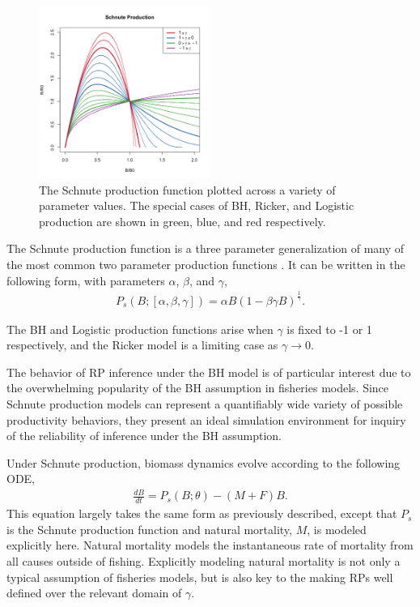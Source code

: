 \documentclass[12pt]{article}
\begin{document}
%
\begin{figure}
\vspace{-2cm}
\includegraphics[width=0.5\textwidth]{../gpBias/g3.png}
\vspace{-1cm}
\caption{
The Schnute production function plotted across a variety of parameter
values. The special cases of BH, Ricker, and Logistic production are shown in
green, blue, and red respectively.
}
\label{sRegimes}
\end{figure}
The Schnute production function is a three parameter generalization of many of 
the most common two parameter production functions . %
It can be written in the following form, with parameters $\alpha$, $\beta$, and $\gamma$,
%
\begin{align}
P_s(B; [\alpha, \beta, \gamma]) = \alpha B (1-\beta\gamma B)^{\frac{1}{\gamma}}.
\end{align}

%
The BH and Logistic production functions arise when $\gamma$ is fixed to -1 or 
1 respectively, and the Ricker model is a limiting case as $\gamma\rightarrow0$. %

%
The behavior of RP inference under the BH model is of particular interest due 
to the overwhelming popularity of the BH assumption in fisheries models.
Since Schnute production models can represent a quantifiably wide variety 
of possible productivity behaviors, they present an ideal simulation 
environment for inquiry of the reliability of inference under the BH 
assumption.

%
Under Schnute production, biomass dynamics evolve according to the following ODE, 
%
\begin{align}
\frac{dB}{dt} = P_s(B;\theta) - (M+F)B. \label{schnuteSimple}
\end{align}
%
This equation largely takes the same form as previously described, except 
that $P_s$ is the Schnute production function and natural mortality, $M$, is modeled 
explicitly here. %
Natural mortality models the instantaneous rate of mortality from all causes 
outside of fishing. Explicitly modeling natural mortality is not 
only a typical assumption of fisheries models, but is also key to the making 
RPs well defined over the relevant domain of $\gamma$.
\end{document}
